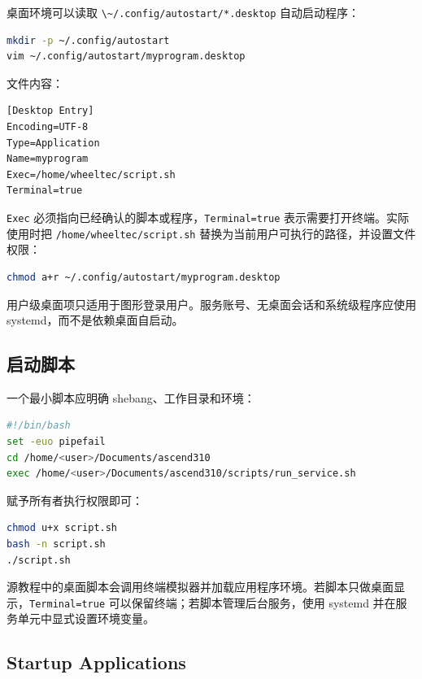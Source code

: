 桌面环境可以读取
\passthrough{\lstinline!\~/.config/autostart/*.desktop!} 自动启动程序：

\begin{lstlisting}[language=bash]
mkdir -p ~/.config/autostart
vim ~/.config/autostart/myprogram.desktop
\end{lstlisting}

文件内容：

\begin{lstlisting}
[Desktop Entry]
Encoding=UTF-8
Type=Application
Name=myprogram
Exec=/home/wheeltec/script.sh
Terminal=true
\end{lstlisting}

\passthrough{\lstinline!Exec!}
必须指向已经确认的脚本或程序，\passthrough{\lstinline!Terminal=true!}
表示需要打开终端。实际使用时把
\passthrough{\lstinline!/home/wheeltec/script.sh!}
替换为当前用户可执行的路径，并设置文件权限：

\begin{lstlisting}[language=bash]
chmod a+r ~/.config/autostart/myprogram.desktop
\end{lstlisting}

用户级桌面项只适用于图形登录用户。服务账号、无桌面会话和系统级程序应使用
systemd，而不是依赖桌面自启动。

\subsection{启动脚本}\label{ux542fux52a8ux811aux672c}

一个最小脚本应明确 shebang、工作目录和环境：

\begin{lstlisting}[language=bash]
#!/bin/bash
set -euo pipefail
cd /home/<user>/Documents/ascend310
exec /home/<user>/Documents/ascend310/scripts/run_service.sh
\end{lstlisting}

赋予所有者执行权限即可：

\begin{lstlisting}[language=bash]
chmod u+x script.sh
bash -n script.sh
./script.sh
\end{lstlisting}

源教程中的桌面脚本会调用终端模拟器并加载应用程序环境。若脚本只做桌面显示，\passthrough{\lstinline!Terminal=true!}
可以保留终端；若脚本管理后台服务，使用 systemd
并在服务单元中显式设置环境变量。

\subsection{Startup Applications}\label{startup-applications}

